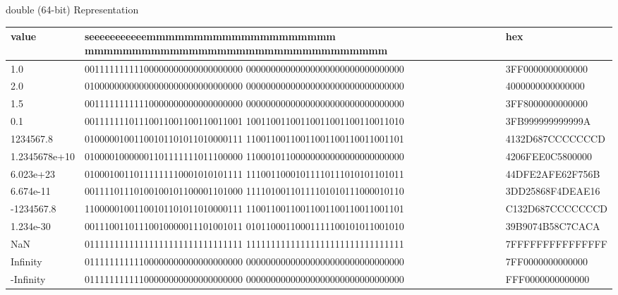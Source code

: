 \begin{withoutheadline}
\begin{frame}[fragile]{double (64-bit) Representation}
\setlength{\tabcolsep}{2pt}
\tiny
\ttfamily
\begin{tabular}{p{1.6cm}|p{7.5cm}|p{1.75cm}} \toprule
value         & seeeeeeeeeeemmmmmmmmmmmmmmmmmmmm mmmmmmmmmmmmmmmmmmmmmmmmmmmmmmmm &              hex \\ \midrule
1.0           & 00111111111100000000000000000000 00000000000000000000000000000000 & 3FF0000000000000 \\
2.0           & 01000000000000000000000000000000 00000000000000000000000000000000 & 4000000000000000 \\
1.5           & 00111111111110000000000000000000 00000000000000000000000000000000 & 3FF8000000000000 \\
0.1           & 00111111101110011001100110011001 10011001100110011001100110011010 & 3FB999999999999A \\
1234567.8     & 01000001001100101101011010000111 11001100110011001100110011001101 & 4132D687CCCCCCCD \\
1.2345678e+10 & 01000010000001101111111011100000 11000101100000000000000000000000 & 4206FEE0C5800000 \\
6.023e+23     & 01000100110111111110001010101111 11100110001011110111010101101011 & 44DFE2AFE62F756B \\
6.674e-11     & 00111101110100100101100001101000 11110100110111101010111000010110 & 3DD25868F4DEAE16 \\
-1234567.8    & 11000001001100101101011010000111 11001100110011001100110011001101 & C132D687CCCCCCCD \\
1.234e-30     & 00111001101110010000011101001011 01011000110001111100101011001010 & 39B9074B58C7CACA \\    
NaN           & 01111111111111111111111111111111 11111111111111111111111111111111 & 7FFFFFFFFFFFFFFF \\
Infinity      & 01111111111100000000000000000000 00000000000000000000000000000000 & 7FF0000000000000 \\
-Infinity     & 01111111111100000000000000000000 00000000000000000000000000000000 & FFF0000000000000 \\ \bottomrule
\end{tabular}
\end{frame}
    

\end{withoutheadline}

